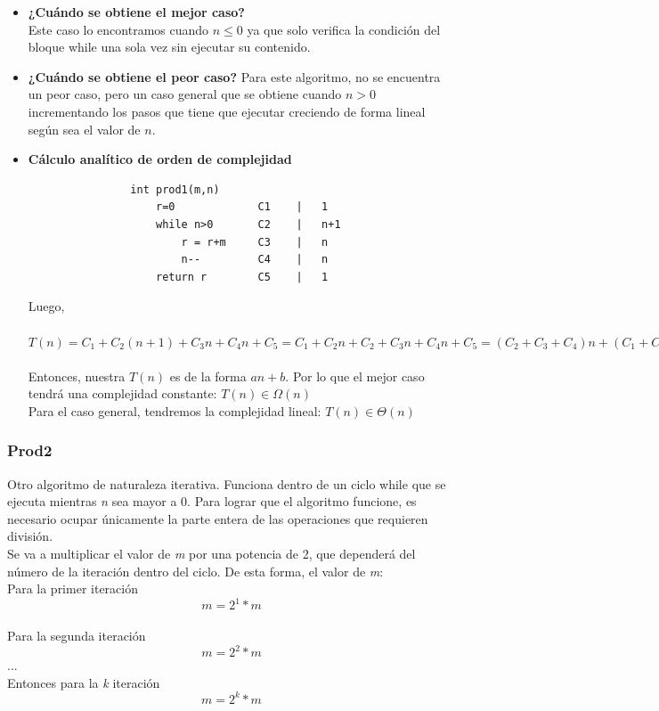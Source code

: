 \documentclass{report}
\begin{document}
            \begin{itemize}
                \item\textbf{¿Cu\'ando se obtiene el mejor caso?}\\
                Este caso lo encontramos cuando $n \leq 0$ ya que solo verifica la condici\'on del bloque while una sola vez sin ejecutar su contenido.
                \item\textbf{¿Cu\'ando se obtiene el peor caso?}
                Para este algoritmo, no se encuentra un peor caso, pero un caso general que se obtiene cuando $n > 0$ incrementando los pasos que tiene que ejecutar creciendo de forma lineal según sea el valor de $n$.
                \item\textbf{C\'alculo anal\'itico de orden de complejidad}
                \begin{verbatim}
                int prod1(m,n)
                    r=0             C1    |   1
                    while n>0       C2    |   n+1
                        r = r+m     C3    |   n     
                        n--         C4    |   n
                    return r        C5    |   1
                \end{verbatim}
                Luego,\\\\$T(n) = C_{1}+C_{2}(n+1)+C_{3}n+C_{4}n+C_{5} = C_{1}+C_{2}n+C_{2}+C_{3}n+C_{4}n+C_{5} = (C_{2}+C_{3}+C_{4})n+(C_{1}+C_{2}+C_{5})$\\\\
                Entonces, nuestra $T(n)$ es de la forma $an+b$. Por lo que el mejor caso tendrá una complejidad constante: $ T(n) \in \Omega(n)$\\
                Para el caso general, tendremos la complejidad lineal: $ T(n) \in \Theta(n)$
            \end{itemize}
            
        \subsubsection*{Prod2}
            Otro algoritmo de naturaleza iterativa. Funciona dentro de un ciclo while que se ejecuta mientras \textit{n} sea mayor a 0. Para lograr que el algoritmo funcione, es necesario ocupar únicamente la parte entera de las operaciones que requieren división.\\
            
            Se va a multiplicar el valor de \textit{m} por una potencia de 2, que dependerá del número de la iteración dentro del ciclo. De esta forma, el valor de \textit{m}:\\
            Para la primer iteración
            $$m = 2^1 * m$$\\
            Para la segunda iteración
            $$m = 2^2 * m$$
            ...\\
            Entonces para la \textit{k} iteración
            $$m = 2^k * m$$\\
            
\end{document}
